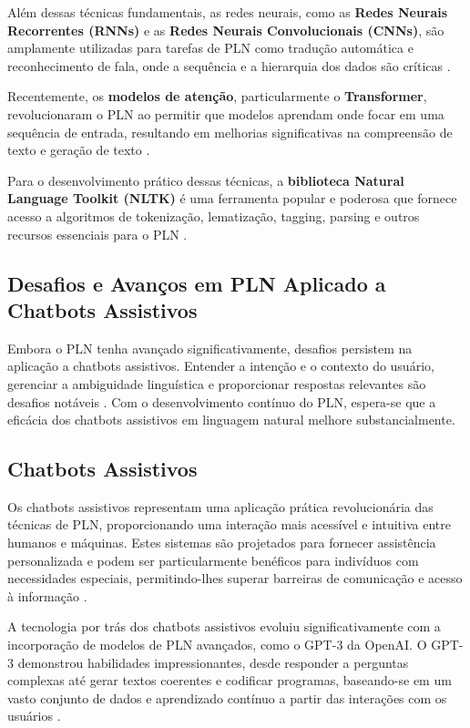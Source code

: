 \documentclass[conference]{IEEEtran}
\begin{document}
Além dessas técnicas fundamentais, as redes neurais, como as \textbf{Redes Neurais Recorrentes (RNNs)} 
e as \textbf{Redes Neurais Convolucionais (CNNs)}, são amplamente utilizadas para tarefas de PLN 
como tradução automática e reconhecimento de fala, 
onde a sequência e a hierarquia dos dados são críticas \cite{Goodfellow2016}.

Recentemente, os \textbf{modelos de atenção}, particularmente o \textbf{Transformer}, 
revolucionaram o PLN ao permitir que modelos aprendam onde focar em uma sequência de entrada, 
resultando em melhorias significativas na compreensão de texto e geração de texto \cite{Vaswani2017}.

Para o desenvolvimento prático dessas técnicas, a \textbf{biblioteca Natural Language Toolkit (NLTK)} é 
uma ferramenta popular e poderosa que fornece acesso a algoritmos de tokenização, lematização, tagging, parsing 
e outros recursos essenciais para o PLN \cite{Bird2009}.



\subsection{Desafios e Avanços em PLN Aplicado a Chatbots Assistivos}
Embora o PLN tenha avançado significativamente, desafios persistem na aplicação a chatbots assistivos. 
Entender a intenção e o contexto do usuário, gerenciar a ambiguidade linguística e proporcionar 
respostas relevantes são desafios notáveis \cite{McTear2016}. 
Com o desenvolvimento contínuo do PLN, espera-se que a eficácia dos chatbots assistivos 
em linguagem natural melhore substancialmente.



\subsection{Chatbots Assistivos}
Os chatbots assistivos representam uma aplicação prática revolucionária das técnicas de PLN, 
proporcionando uma interação mais acessível e intuitiva entre humanos e máquinas. 
Estes sistemas são projetados para fornecer assistência personalizada e podem ser 
particularmente benéficos para indivíduos com necessidades especiais, permitindo-lhes 
superar barreiras de comunicação e acesso à informação \cite{Laranjo2018}.

A tecnologia por trás dos chatbots assistivos evoluiu significativamente com a 
incorporação de modelos de PLN avançados, como o GPT-3 da OpenAI. 
O GPT-3 demonstrou habilidades impressionantes, desde responder a perguntas complexas até 
gerar textos coerentes e codificar programas, baseando-se em um vasto conjunto de dados 
e aprendizado contínuo a partir das interações com os usuários \cite{Brown2020}.
\end{document}
